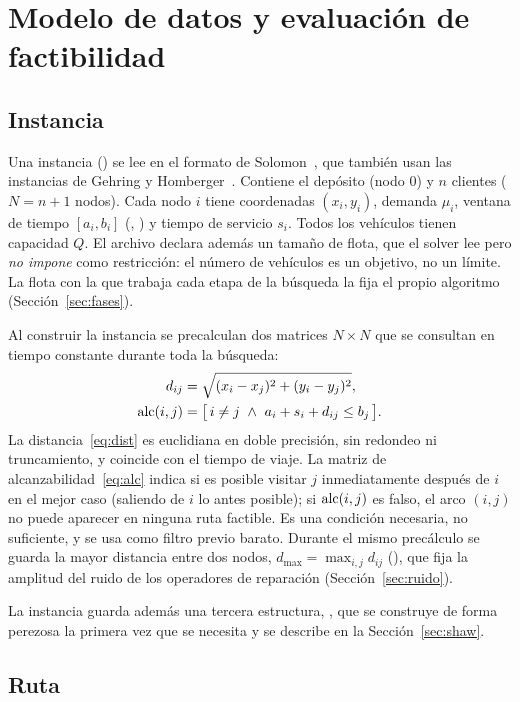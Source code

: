 \section{Modelo de datos y evaluación de factibilidad}
\label{sec:modelo}

\subsection{Instancia}

Una instancia () se lee en el formato de Solomon~\cite{solomon1987}, que también
usan las instancias de Gehring y Homberger~\cite{gehring1999}. Contiene el depósito (nodo $0$) y
$n$ clientes ($N=n+1$ nodos). Cada nodo $i$ tiene coordenadas $(x_i,y_i)$, demanda $\mu_i$,
ventana de tiempo $[a_i,b_i]$ (, ) y tiempo de servicio $s_i$.
Todos los vehículos tienen capacidad $Q$. El archivo declara además un tamaño de flota, que el
solver lee pero \emph{no impone} como restricción: el número de vehículos es un objetivo, no
un límite. La flota con la que trabaja cada etapa de la búsqueda la fija el propio algoritmo
(Sección~\ref{sec:fases}).

Al construir la instancia se precalculan dos matrices $N\times N$ que se consultan en tiempo
constante durante toda la búsqueda:
\begin{align}
d_{ij} &= \sqrt{(x_i-x_j)^2+(y_i-y_j)^2}, \label{eq:dist}\\
\operatorname{alc}(i,j) &= \bigl[\, i\neq j \ \wedge\ a_i+s_i+d_{ij}\le b_j \,\bigr]. \label{eq:alc}
\end{align}
La distancia~\eqref{eq:dist} es euclidiana en doble precisión, sin redondeo ni truncamiento, y
coincide con el tiempo de viaje. La matriz de alcanzabilidad~\eqref{eq:alc} indica si es
posible visitar $j$ inmediatamente después de $i$ en el mejor caso (saliendo de $i$ lo antes
posible); si $\operatorname{alc}(i,j)$ es falso, el arco $(i,j)$ no puede aparecer en ninguna ruta
factible. Es una condición necesaria, no suficiente, y se usa como filtro previo barato.
Durante el mismo precálculo se guarda la mayor distancia entre dos nodos,
$d_{\max}=\max_{i,j}d_{ij}$ (), que fija la amplitud del ruido de los
operadores de reparación (Sección~\ref{sec:ruido}).

La instancia guarda además una tercera estructura, , que se construye de
forma perezosa la primera vez que se necesita y se describe en la
Sección~\ref{sec:shaw}.

\subsection{Ruta}

